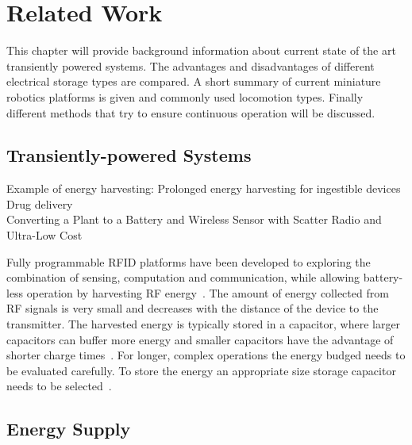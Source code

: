 \chapter{Related Work}
\label{chp:related_work}

This chapter will provide background information about current state of the art transiently powered systems. The advantages and disadvantages of different electrical storage types are compared. A short summary of current miniature robotics platforms is given and commonly used locomotion types. Finally different methods that try to ensure continuous operation will be discussed.

\section{Transiently-powered Systems}
\label{sec:tp_systems}


Example of energy harvesting: Prolonged energy harvesting for ingestible devices~\cite{plonski_tranro_2016}
Drug delivery
\\
Converting a Plant to a Battery and Wireless Sensor with Scatter Radio and Ultra-Low Cost


Fully programmable RFID platforms have been developed to exploring the combination of sensing, computation and communication, while allowing battery-less operation by harvesting RF energy~\cite{sample_transim_2008}.
The amount of energy collected from RF signals is very small and decreases with the distance of the device to the transmitter.
The harvested energy is typically stored in a capacitor, where larger capacitors can buffer more energy and smaller capacitors have the advantage of shorter charge times~\cite{gummerson_mobisys_2010}.
For longer, complex operations the energy budged needs to be evaluated carefully.
To store the energy an appropriate size storage capacitor needs to be selected~\cite{naderiparizi_rfid_2015}.


\section{Energy Supply}
\label{sec:energy_supply}

